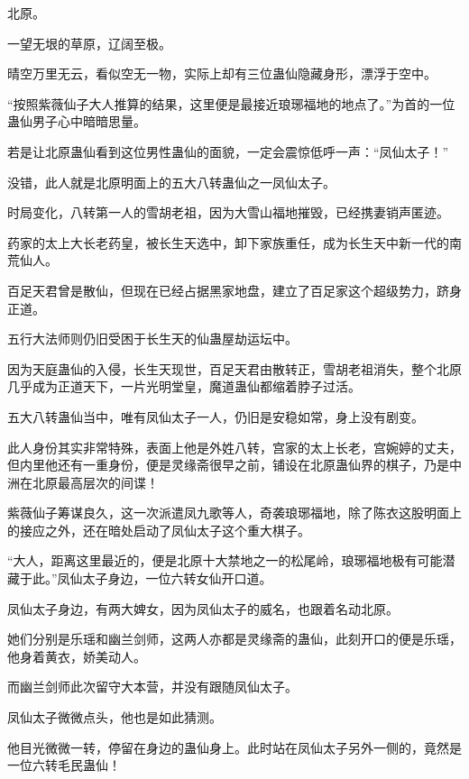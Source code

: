 
\begin{this_body}



北原。

一望无垠的草原，辽阔至极。

晴空万里无云，看似空无一物，实际上却有三位蛊仙隐藏身形，漂浮于空中。

“按照紫薇仙子大人推算的结果，这里便是最接近琅琊福地的地点了。”为首的一位蛊仙男子心中暗暗思量。

若是让北原蛊仙看到这位男性蛊仙的面貌，一定会震惊低呼一声：“凤仙太子！”

没错，此人就是北原明面上的五大八转蛊仙之一凤仙太子。

时局变化，八转第一人的雪胡老祖，因为大雪山福地摧毁，已经携妻销声匿迹。

药家的太上大长老药皇，被长生天选中，卸下家族重任，成为长生天中新一代的南荒仙人。

百足天君曾是散仙，但现在已经占据黑家地盘，建立了百足家这个超级势力，跻身正道。

五行大法师则仍旧受困于长生天的仙蛊屋劫运坛中。

因为天庭蛊仙的入侵，长生天现世，百足天君由散转正，雪胡老祖消失，整个北原几乎成为正道天下，一片光明堂皇，魔道蛊仙都缩着脖子过活。

五大八转蛊仙当中，唯有凤仙太子一人，仍旧是安稳如常，身上没有剧变。

此人身份其实非常特殊，表面上他是外姓八转，宫家的太上长老，宫婉婷的丈夫，但内里他还有一重身份，便是灵缘斋很早之前，铺设在北原蛊仙界的棋子，乃是中洲在北原最高层次的间谍！

紫薇仙子筹谋良久，这一次派遣凤九歌等人，奇袭琅琊福地，除了陈衣这股明面上的接应之外，还在暗处启动了凤仙太子这个重大棋子。

“大人，距离这里最近的，便是北原十大禁地之一的松尾岭，琅琊福地极有可能潜藏于此。”凤仙太子身边，一位六转女仙开口道。

凤仙太子身边，有两大婢女，因为凤仙太子的威名，也跟着名动北原。

她们分别是乐瑶和幽兰剑师，这两人亦都是灵缘斋的蛊仙，此刻开口的便是乐瑶，他身着黄衣，娇美动人。

而幽兰剑师此次留守大本营，并没有跟随凤仙太子。

凤仙太子微微点头，他也是如此猜测。

他目光微微一转，停留在身边的蛊仙身上。此时站在凤仙太子另外一侧的，竟然是一位六转毛民蛊仙！


\end{this_body}
